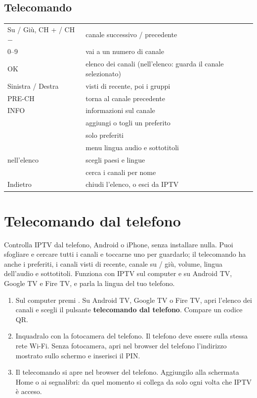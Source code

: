 \subsection{Telecomando}
\begin{xltabular}{\linewidth}{@{}KX@{}}
Su / Giù, CH + / CH $-$ & canale successivo / precedente \\
0--9 & vai a un numero di canale \\
OK & elenco dei canali (nell'elenco: guarda il canale selezionato) \\
Sinistra / Destra & visti di recente, poi i gruppi \\
PRE-CH & torna al canale precedente \\
INFO & informazioni sul canale \\
 & aggiungi o togli un preferito \\
 & solo preferiti \\
 & menu lingua audio e sottotitoli \\
 nell'elenco & scegli paesi e lingue \\
 & cerca i canali per nome \\
Indietro & chiudi l'elenco, o esci da IPTV \\
\bottomrule
\end{xltabular}


\section{Telecomando dal telefono}
\label{sec:remote}

Controlla IPTV dal telefono, Android o iPhone, senza installare nulla. Puoi
sfogliare e cercare tutti i canali e toccarne uno per guardarlo; il
telecomando ha anche i preferiti, i canali visti di recente, canale su / giù,
volume, lingua dell'audio e sottotitoli. Funziona con IPTV sul computer e su
Android TV, Google TV e Fire TV, e parla la lingua del tuo telefono.

\begin{enumerate}
  \item Sul computer premi . Su Android TV, Google TV o Fire TV, apri
        l'elenco dei canali e scegli il pulsante \textbf{telecomando dal
        telefono}. Compare un codice QR.
  \item Inquadralo con la fotocamera del telefono. Il telefono deve essere
        sulla stessa rete Wi-Fi. Senza fotocamera, apri nel browser del
        telefono l'indirizzo mostrato sullo schermo e inserisci il PIN.
  \item Il telecomando si apre nel browser del telefono. Aggiungilo alla
        schermata Home o ai segnalibri: da quel momento si collega da solo
        ogni volta che IPTV è acceso.
\end{enumerate}

